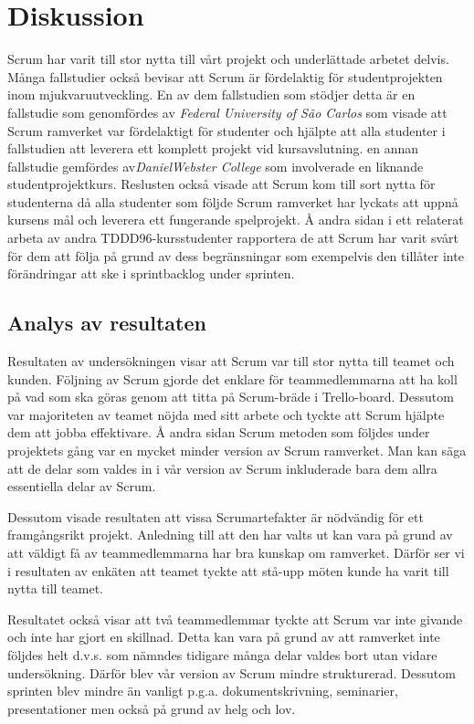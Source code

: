 
\section{Diskussion}
\label{sec:Lieth_Wahid-discussion}
Scrum har varit till stor nytta till vårt projekt och underlättade arbetet delvis. Många fallstudier också bevisar att Scrum är fördelaktig för studentprojekten inom mjukvaruutveckling. En av dem fallstudien som stödjer detta är
en fallstudie som genomfördes av \textit{Federal University of São Carlos} som visade att Scrum ramverket var fördelaktigt för studenter och hjälpte att alla studenter i fallstudien att leverera ett komplett projekt vid kursavslutning. en annan fallstudie gemfördes av\textit{DanielWebster College} \cite{ASEEPEER95:online} som involverade en liknande studentprojektkurs. Reslusten också visade att Scrum kom till sort nytta för studenterna då alla studenter som följde Scrum ramverket har lyckats att uppnå kursens mål och leverera ett fungerande spelprojekt. Å andra sidan i ett relaterat arbeta av andra TDDD96-kursstudenter \cite{overvakn73:online} rapportera de att Scrum har varit svårt för dem att följa på grund av dess begränsningar som exempelvis den tillåter inte förändringar att ske i sprintbacklog under sprinten.


\subsection{Analys av resultaten}
Resultaten av undersökningen visar att Scrum var till stor nytta till teamet och kunden. Följning av Scrum gjorde det enklare för teammedlemmarna att ha koll på vad som ska göras genom att titta på Scrum-bräde i Trello-board. Dessutom var majoriteten av teamet nöjda med sitt arbete och tyckte att Scrum hjälpte dem att jobba effektivare. Å andra sidan Scrum metoden som följdes under projektets gång var en mycket minder version av Scrum ramverket. Man kan säga att de delar som valdes in i vår version av Scrum inkluderade bara dem allra essentiella delar av Scrum.

Dessutom visade resultaten att vissa Scrumartefakter är nödvändig för ett framgångsrikt projekt. Anledning till att den har valts ut kan vara på grund av att väldigt få av teammedlemmarna har bra kunskap om ramverket. Därför ser vi i resultaten av enkäten att teamet tyckte att stå-upp möten kunde ha varit till nytta till teamet. 

Resultatet också visar att två teammedlemmar tyckte att Scrum var inte givande och inte har gjort en skillnad. Detta kan vara på grund av att ramverket inte följdes helt d.v.s. som nämndes tidigare många delar valdes bort utan vidare undersökning. Därför blev vår version av Scrum mindre strukturerad. Dessutom sprinten blev mindre än vanligt p.g.a. dokumentskrivning, seminarier, presentationer men också på grund av helg och lov.
